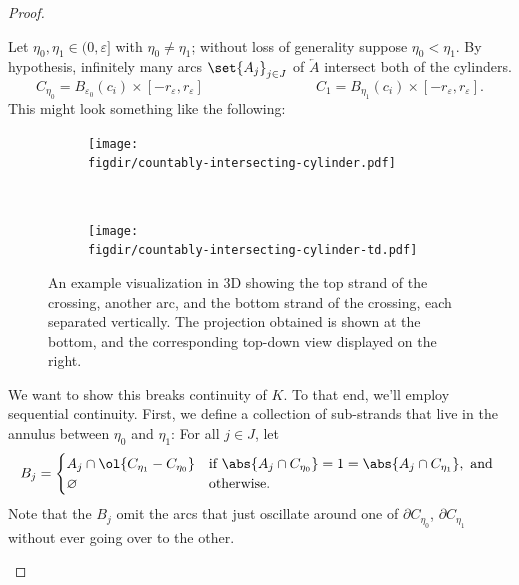 \begin{proof}
\begin{leftbar}
    Let $\eta_0, \eta_1 \in (0, \varepsilon]$ with $\eta_0 \neq
    \eta_1$; without loss of generality suppose $\eta_0 < \eta_1$. By
    hypothesis, infinitely many arcs $\set{A_j}_{j \in J}$ of
    $\overleftarrow{A}$ intersect both of the cylinders.
    \[
      C_{\eta_0} = B_{\varepsilon_0}(c_i) \times [-r_\varepsilon,
      r_\varepsilon] \qquad\qquad \qquad\qquad C_1 = B_{\eta_1}(c_i)
      \times [-r_\varepsilon, r_\varepsilon].
    \]
    This might look something like the following:
    \begin{figure}[H]
      \centering
      \begin{subfigure}[t]{.49\linewidth}
        \centering
        \texttt{[image: \\figdir/countably-intersecting-cylinder.pdf]}
      \end{subfigure}~
      \begin{subfigure}[t]{.49\linewidth}
        \centering
        \texttt{[image: \\figdir/countably-intersecting-cylinder-td.pdf]}
      \end{subfigure}
      \caption{An example visualization in 3D showing the top strand
        of the crossing, another arc, and the bottom strand of the
        crossing, each separated vertically. The projection obtained
        is shown at the bottom, and the corresponding top-down view
        displayed on the right.}
      \label{fig:example-3d-oscillation-visual}
    \end{figure}
    We want to show this breaks continuity of $K$. To that end, we'll
    employ sequential continuity. First, we define a collection of
    sub-strands that live in the annulus between $\eta_0$ and $\eta_1$:
    For all $j\in J$, let
    \[
      B_j =
      \begin{cases}
        A_j \cap \ol{C_{\eta_1} - C_{\eta_0}} & \text{if } \abs{A_j
          \cap C_{\eta_0}} = 1 = \abs{A_j \cap C_{\eta_1}}, \text{ and }\\
        \varnothing & \text{otherwise}.
      \end{cases}
    \]
    Note that the $B_j$ omit the arcs that just oscillate around one of
    $\partial C_{\eta_0}$, $\partial C_{\eta_1}$ without ever going over
    to the other.


\end{leftbar}
\end{proof}
